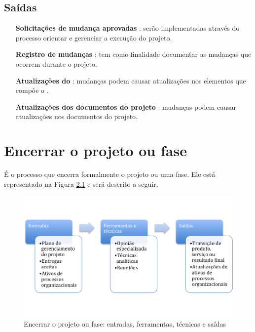 \section{Saídas}

\begin{itemize}
	
	
	\item[\textbf{Solicitações de mudança aprovadas}] : serão implementadas através do processo orientar e gerenciar a execução do projeto.
	
	\item[\textbf{Registro de mudanças}] : tem como finalidade documentar as mudanças que ocorrem durante o projeto.
	
	\item[\textbf{Atualizações do \planproj}] :	mudanças podem causar atualizações nos elementos que compõe o \planproj.
	
	\item[\textbf{Atualizações dos documentos do projeto}] : mudanças podem causar atualizações nos documentos do projeto.
	
\end{itemize}



\chapter{Encerrar o projeto ou fase}

É o processo que encerra formalmente o projeto ou uma fase. Ele está representado na Figura \ref{fig:encerrar:etfs} e será descrito a seguir.

\begin{figure}[!h]
	\centering
	\includegraphics[scale=0.75]{Figuras/encerrar_efts.png}
	\caption{Encerrar o projeto ou fase: entradas, ferramentas, técnicas e saídas}
	\label{fig:encerrar:etfs}
\end{figure}

